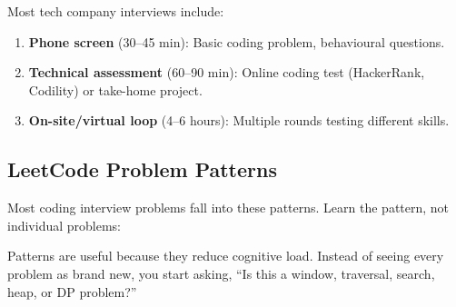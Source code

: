 \documentclass[12pt, a4paper, oneside]{book}
\begin{document}
Most tech company interviews include:
\begin{enumerate}[leftmargin=2em]
    \item \textbf{Phone screen} (30--45 min): Basic coding problem, behavioural questions.
    \item \textbf{Technical assessment} (60--90 min): Online coding test (HackerRank, Codility) or take-home project.
    \item \textbf{On-site/virtual loop} (4--6 hours): Multiple rounds testing different skills.
\end{enumerate}

\subsection{LeetCode Problem Patterns}

Most coding interview problems fall into these patterns. Learn the pattern, not individual problems:

\begin{notebox}
Patterns are useful because they reduce cognitive load. Instead of seeing every problem as brand new, you start asking, ``Is this a window, traversal, search, heap, or DP problem?''
\end{notebox}
\end{document}

